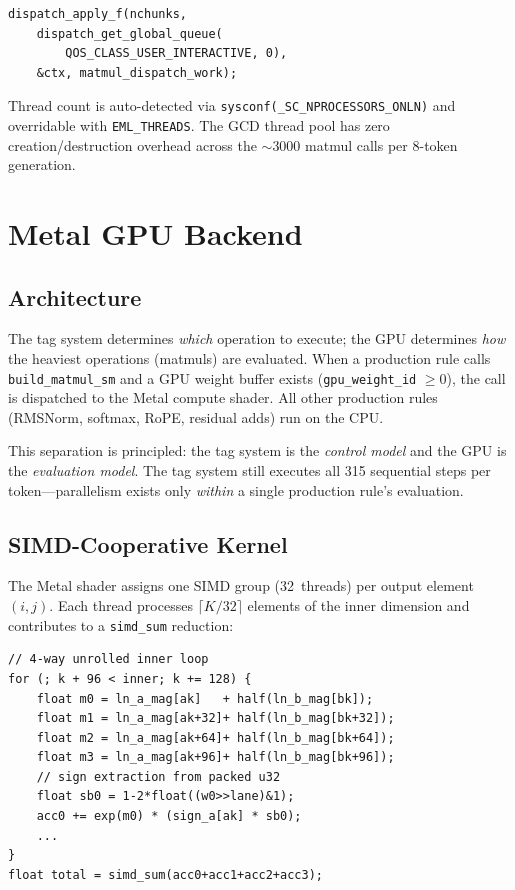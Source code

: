 \documentclass[acmsmall,nonacm]{acmart}
\begin{document}
\begin{lstlisting}[language=C89,caption={GCD parallel dispatch}]
dispatch_apply_f(nchunks,
    dispatch_get_global_queue(
        QOS_CLASS_USER_INTERACTIVE, 0),
    &ctx, matmul_dispatch_work);
\end{lstlisting}

Thread count is auto-detected via \texttt{sysconf(\_SC\_NPROCESSORS\_ONLN)}
and overridable with \texttt{EML\_THREADS}.  The GCD thread pool
has zero creation/destruction overhead across the ${\sim}3000$
matmul calls per 8-token generation.


\section{Metal GPU Backend}
\label{sec:gpu}

\subsection{Architecture}

The tag system determines \emph{which} operation to execute; the GPU
determines \emph{how} the heaviest operations (matmuls) are evaluated.
When a production rule calls \texttt{build\_matmul\_sm} and a GPU
weight buffer exists (\texttt{gpu\_weight\_id} $\ge 0$), the call is
dispatched to the Metal compute shader.  All other production rules
(RMSNorm, softmax, RoPE, residual adds) run on the CPU.

This separation is principled: the tag system is the \emph{control
model} and the GPU is the \emph{evaluation model}.  The tag system
still executes all 315 sequential steps per token---parallelism
exists only \emph{within} a single production rule's evaluation.

\subsection{SIMD-Cooperative Kernel}

The Metal shader assigns one SIMD group (32~threads) per output
element $(i, j)$.  Each thread processes $\lceil K/32 \rceil$
elements of the inner dimension and contributes to a
\texttt{simd\_sum} reduction:

\begin{lstlisting}[language=C89,caption={Metal kernel core (simplified)}]
// 4-way unrolled inner loop
for (; k + 96 < inner; k += 128) {
    float m0 = ln_a_mag[ak]   + half(ln_b_mag[bk]);
    float m1 = ln_a_mag[ak+32]+ half(ln_b_mag[bk+32]);
    float m2 = ln_a_mag[ak+64]+ half(ln_b_mag[bk+64]);
    float m3 = ln_a_mag[ak+96]+ half(ln_b_mag[bk+96]);
    // sign extraction from packed u32
    float sb0 = 1-2*float((w0>>lane)&1);
    acc0 += exp(m0) * (sign_a[ak] * sb0);
    ...
}
float total = simd_sum(acc0+acc1+acc2+acc3);
\end{lstlisting}
\end{document}
